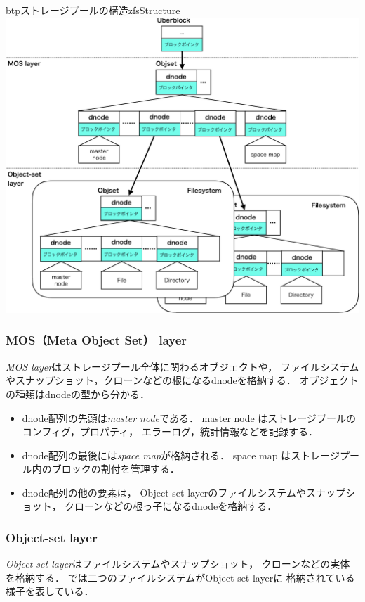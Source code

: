 \begin{myfig}{btp}{ストレージプールの構造}{zfsStructure}
  \centering\includegraphics[scale=0.7]{Fig/zfsStructure-crop.pdf}
\end{myfig}

\subsubsection{MOS（Meta Object Set） layer}
\emph{MOS layer}はストレージプール全体に関わるオブジェクトや，
ファイルシステムやスナップショット，クローンなどの根になるdnodeを格納する．
オブジェクトの種類はdnodeの型から分かる．
\begin{itemize}
\item dnode配列の先頭は\emph{master node}である．
  master node はストレージプールのコンフィグ，プロパティ，
  エラーログ，統計情報などを記録する．
\item dnode配列の最後には\emph{space map}が格納される．
  space map はストレージプール内のブロックの割付を管理する．
\item dnode配列の他の要素は，
  Object-set layerのファイルシステムやスナップショット，
  クローンなどの根っ子になるdnodeを格納する．
\end{itemize}

\subsubsection{Object-set layer}
\emph{Object-set layer}はファイルシステムやスナップショット，
クローンなどの実体を格納する．
では二つのファイルシステムがObject-set layerに
格納されている様子を表している．

